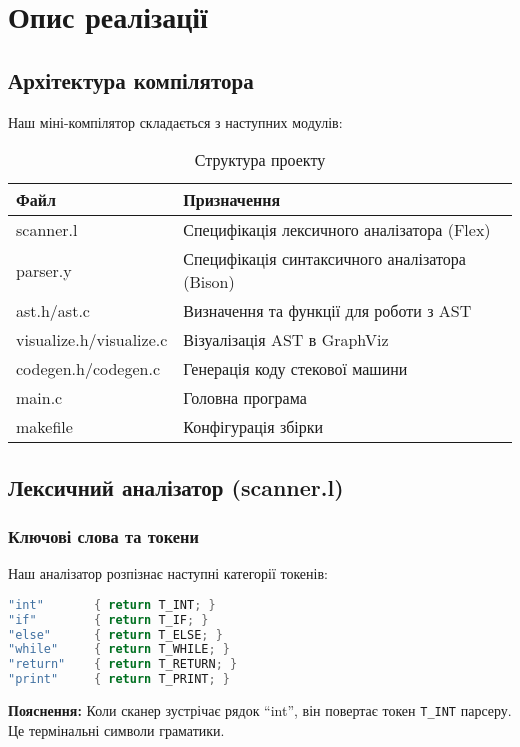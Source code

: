 \documentclass[12pt,a4paper]{article}
\begin{document}
\section{Опис реалізації}

\subsection{Архітектура компілятора}

Наш міні-компілятор складається з наступних модулів:

\begin{table}[h]
\centering
\begin{tabular}{|l|l|}
\hline
\textbf{Файл} & \textbf{Призначення} \\ \hline
scanner.l & Специфікація лексичного аналізатора (Flex) \\ \hline
parser.y & Специфікація синтаксичного аналізатора (Bison) \\ \hline
ast.h/ast.c & Визначення та функції для роботи з AST \\ \hline
visualize.h/visualize.c & Візуалізація AST в GraphViz \\ \hline
codegen.h/codegen.c & Генерація коду стекової машини \\ \hline
main.c & Головна програма \\ \hline
makefile & Конфігурація збірки \\ \hline
\end{tabular}
\caption{Структура проекту}
\end{table}

\subsection{Лексичний аналізатор (scanner.l)}

\subsubsection{Ключові слова та токени}

Наш аналізатор розпізнає наступні категорії токенів:

\begin{lstlisting}[language=C]
"int"       { return T_INT; }
"if"        { return T_IF; }
"else"      { return T_ELSE; }
"while"     { return T_WHILE; }
"return"    { return T_RETURN; }
"print"     { return T_PRINT; }
\end{lstlisting}

\textbf{Пояснення:} Коли сканер зустрічає рядок ``int'', він повертає токен \texttt{T\_INT} парсеру. Це термінальні символи граматики.
\end{document}
